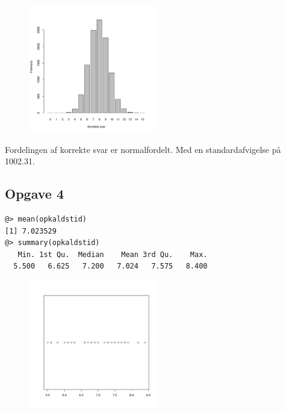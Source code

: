 \documentclass{article}
\begin{document}
\begin{figure}[H] 
  \centering
  \includegraphics[width=0.5\textwidth]{../velser/uge37/R/opg3plot.pdf}
\end{figure}

Fordelingen af korrekte svar er normalfordelt. Med en standardafvigelse på
1002.31.


\subsection{Opgave 4}

\begin{lstlisting}
@> mean(opkaldstid)
[1] 7.023529
@> summary(opkaldstid)
   Min. 1st Qu.  Median    Mean 3rd Qu.    Max.
  5.500   6.625   7.200   7.024   7.575   8.400
\end{lstlisting}


\begin{figure}[H] 
  \centering
  \includegraphics[width=0.5\textwidth]{../velser/uge37/R/opg4plot.pdf}
\end{figure}
\end{document}
